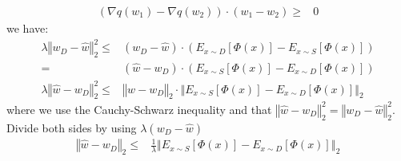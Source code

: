 \documentclass{article}
\begin{document}
\begin{description}
    \begin{align*}
      \left(\nabla q(w_{1})-\nabla q(w_{2})\right)\cdot\left(w_{1}-w_{2}\right) \geq &  0
    \end{align*}
     we have:
     \begin{align*}
       \lambda\left\Vert w_{D}-\hat{w}\right\Vert _{2}^{2} \leq & \left(w_{D}-\hat{w}\right)\cdot\left(E_{x\sim D}\left[\Phi\left(x\right)\right]-E_{x\sim S}\left[\Phi\left(x\right)\right]\right) \\ 
       = & \left(\hat{w}-w_{D}\right)\cdot\left(E_{x\sim S}\left[\Phi\left(x\right)\right]-E_{x\sim D}\left[\Phi\left(x\right)\right]\right) \\
       \lambda\left\Vert \hat{w}-w_{D}\right\Vert _{2}^{2}\leq & \left\Vert \hat{w}-w_{D}\right\Vert _{2}\cdot\left\Vert E_{x\sim S}\left[\Phi\left(x\right)\right]-E_{x\sim D}\left[\Phi\left(x\right)\right]\right\Vert _{2}
     \end{align*}
      where we use the Cauchy-Schwarz inequality and that $\left\Vert \hat{w}-w_{D}\right\Vert _{2}^{2}=\left\Vert w_{D}-\hat{w}\right\Vert _{2}^{2}$. Divide both sides by using $\lambda\left(w_{D}-\hat{w}\right)$
      \begin{align*}
        \left\Vert \hat{w}-w_{D}\right\Vert _{2} \leq & \frac{1}{\lambda}\left\Vert E_{x\sim S}\left[\Phi\left(x\right)\right]-E_{x\sim D}\left[\Phi\left(x\right)\right]\right\Vert _{2}
      \end{align*}
\end{description}
\end{document}
